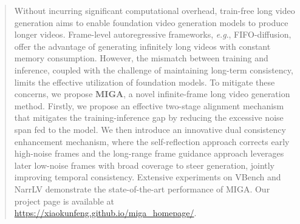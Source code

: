 \documentclass{article}
\theoremstyle{plain}
\theoremstyle{definition}
\theoremstyle{remark}
\newcommand{\eg}{\textit{e}.\textit{g}.}
\begin{document}
\begin{abstract}



Without incurring significant computational overhead, train-free long video generation aims to enable foundation video generation models to produce longer videos.
Frame-level autoregressive frameworks, \eg, FIFO-diffusion, offer the advantage of generating infinitely long videos with constant memory consumption.
However, the mismatch between training and inference, coupled with the challenge of maintaining long-term consistency, limits the effective utilization of foundation models. 
To mitigate these concerns, we propose \textbf{MIGA}, a novel infinite-frame long video generation method. 
Firstly, we propose an effective two-stage alignment mechanism that mitigates the training-inference gap by reducing the excessive noise span fed to the model. We then introduce an innovative dual consistency enhancement mechanism, where the self-reflection approach corrects early high-noise frames and the long-range frame guidance approach leverages later low-noise frames with broad coverage to steer generation, jointly improving temporal consistency. 
Extensive experiments on VBench and NarrLV demonstrate the state-of-the-art performance of MIGA.
Our project page is available at \url{https://xiaokunfeng.github.io/miga_homepage/}.


\end{abstract}
\end{document}
